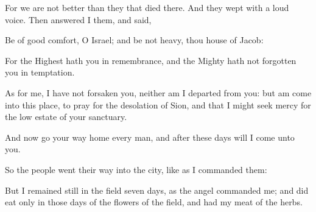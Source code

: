 {\par }{\PP {}For we are not better than they that died there. And they wept with a loud voice. Then answered I them, and said,
\par }{\PP {}Be of good comfort, O Israel; and be not heavy, thou house of Jacob:
\par }{\PP {}For the Highest hath you in remembrance, and the Mighty hath not forgotten you in temptation.
\par }{\PP {}As for me, I have not forsaken you, neither am I departed from you: but am come into this place, to pray for the desolation of Sion, and that I might seek mercy for the low estate of your sanctuary.
\par }{\PP {}And now go your way home every man, and after these days will I come unto you.
\par }{\PP {}So the people went their way into the city, like as I commanded them:
\par }{\PP {}But I remained still in the field seven days, as the angel commanded me; and did eat only in those days of the flowers of the field, and had my meat of the herbs.

}
